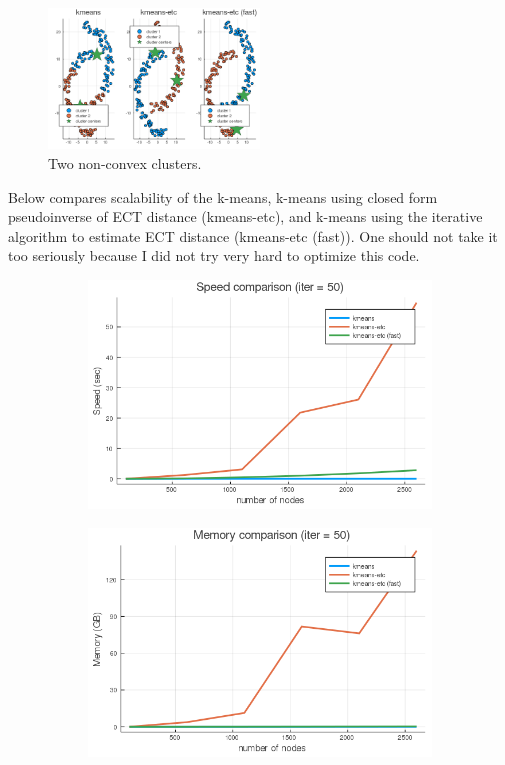 \documentclass[./some_latex_template.tex]{subfiles}
\begin{document}
\begin{figure}[H]
	\centering    
    \includegraphics[width=0.5\textwidth]{figures/nonconvex.png}
    \caption{Two non-convex clusters.}
\end{figure}

Below compares scalability of the k-means, k-means using closed form pseudoinverse of ECT distance (kmeans-etc), and k-means using the iterative algorithm to estimate ECT distance (kmeans-etc (fast)). One should not take it too seriously because I did not try very hard to optimize this code. 

\begin{figure}[H]
  \begin{subfigure}[b]{0.45\textwidth}
    \includegraphics[width=\textwidth]{figures/speed.png}
  \end{subfigure}
  \begin{subfigure}[b]{0.45\textwidth}
    \includegraphics[width=\textwidth]{figures/memory.png}
  \end{subfigure}
\end{figure}
\end{document}
